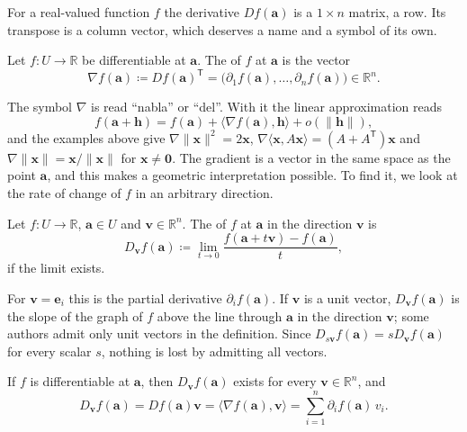 For a real-valued function $f$ the derivative $Df(\mathbf a)$ is a $1\times n$ matrix, a row. Its transpose is a column vector, which deserves a name and a symbol of its own.

\begin{definition}[Gradient]
\label{def:gradient}
Let $f\colon U\to\mathbb R$ be differentiable at $\mathbf a$. The  of $f$ at $\mathbf a$ is the vector
\[
\nabla f(\mathbf a)\coloneqq Df(\mathbf a)^{\mathsf T}=\bigl(\partial_1f(\mathbf a),\ldots,\partial_nf(\mathbf a)\bigr)\in\mathbb R^n .
\]
\end{definition}

The symbol $\nabla$ is read ``nabla'' or ``del''. With it the linear approximation reads
\[
f(\mathbf a+\mathbf h)=f(\mathbf a)+\langle\nabla f(\mathbf a),\mathbf h\rangle+o(\|\mathbf h\|),
\]
and the examples above give $\nabla\|\mathbf x\|^2=2\mathbf x$, $\nabla\langle\mathbf x,A\mathbf x\rangle=(A+A^{\mathsf T})\mathbf x$ and $\nabla\|\mathbf x\|=\mathbf x/\|\mathbf x\|$ for $\mathbf x\ne\mathbf0$. The gradient is a vector in the same space as the point $\mathbf a$, and this makes a geometric interpretation possible. To find it, we look at the rate of change of $f$ in an arbitrary direction.

\begin{definition}
\label{def:directional-derivative}
Let $f\colon U\to\mathbb R$, $\mathbf a\in U$ and $\mathbf v\in\mathbb R^n$. The  of $f$ at $\mathbf a$ in the direction $\mathbf v$ is
\[
D_{\mathbf v}f(\mathbf a)\coloneqq\lim_{t\to0}\frac{f(\mathbf a+t\mathbf v)-f(\mathbf a)}t ,
\]
if the limit exists.
\end{definition}

For $\mathbf v=\mathbf e_i$ this is the partial derivative $\partial_if(\mathbf a)$. If $\mathbf v$ is a unit vector, $D_{\mathbf v}f(\mathbf a)$ is the slope of the graph of $f$ above the line through $\mathbf a$ in the direction $\mathbf v$; some authors admit only unit vectors in the definition. Since $D_{s\mathbf v}f(\mathbf a)=sD_{\mathbf v}f(\mathbf a)$ for every scalar $s$, nothing is lost by admitting all vectors.

\begin{proposition}
\label{prop:directional}
If $f$ is differentiable at $\mathbf a$, then $D_{\mathbf v}f(\mathbf a)$ exists for every $\mathbf v\in\mathbb R^n$, and
\[
D_{\mathbf v}f(\mathbf a)=Df(\mathbf a)\mathbf v=\langle\nabla f(\mathbf a),\mathbf v\rangle=\sum_{i=1}^n\partial_if(\mathbf a)\,v_i .
\]
\end{proposition}


